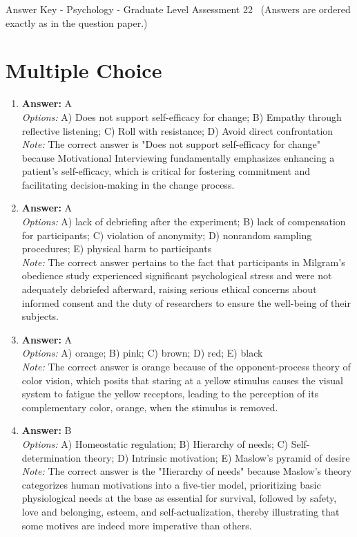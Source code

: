 \documentclass[12pt]{article}
\begin{document}
\begin{center}
Answer Key - Psychology - Graduate Level Assessment 22 \
\small (Answers are ordered exactly as in the question paper.)
\end{center}

\section*{Multiple Choice}
\begin{enumerate}[label=\arabic*.]
\item \textbf{Answer:} A
\\ \textit{Options:} A) Does not support self-efficacy for change; B) Empathy through reflective listening; C) Roll with resistance; D) Avoid direct confrontation
\\ \textit{Note:} The correct answer is "Does not support self-efficacy for change" because Motivational Interviewing fundamentally emphasizes enhancing a patient's self-efficacy, which is critical for fostering commitment and facilitating decision-making in the change process.
\item \textbf{Answer:} A
\\ \textit{Options:} A) lack of debriefing after the experiment; B) lack of compensation for participants; C) violation of anonymity; D) nonrandom sampling procedures; E) physical harm to participants
\\ \textit{Note:} The correct answer pertains to the fact that participants in Milgram's obedience study experienced significant psychological stress and were not adequately debriefed afterward, raising serious ethical concerns about informed consent and the duty of researchers to ensure the well-being of their subjects.
\item \textbf{Answer:} A
\\ \textit{Options:} A) orange; B) pink; C) brown; D) red; E) black
\\ \textit{Note:} The correct answer is orange because of the opponent-process theory of color vision, which posits that staring at a yellow stimulus causes the visual system to fatigue the yellow receptors, leading to the perception of its complementary color, orange, when the stimulus is removed.
\item \textbf{Answer:} B
\\ \textit{Options:} A) Homeostatic regulation; B) Hierarchy of needs; C) Self-determination theory; D) Intrinsic motivation; E) Maslow's pyramid of desire
\\ \textit{Note:} The correct answer is the "Hierarchy of needs" because Maslow's theory categorizes human motivations into a five-tier model, prioritizing basic physiological needs at the base as essential for survival, followed by safety, love and belonging, esteem, and self-actualization, thereby illustrating that some motives are indeed more imperative than others.

\end{enumerate}
\end{document}
